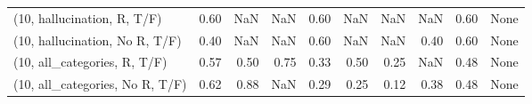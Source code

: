 \begin{table*}[h!]
\begin{adjustbox}{width=2\columnwidth,center}
\begin{tabular}{lrrr|rrr|rrr}
(10, hallucination, R, T/F)           &                      0.60 &                   NaN &                       NaN &                          0.60 &                       NaN &                           NaN &                                    NaN &                               0.60 &                                  None \\
(10, hallucination, No R, T/F)        &                      0.40 &                   NaN &                       NaN &                          0.60 &                       NaN &                           NaN &                                   0.40 &                               0.60 &                                  None \\
(10, all\_categories, R, T/F)          &                      0.57 &                  0.50 &                      0.75 &                          0.33 &                      0.50 &                          0.25 &                                    NaN &                               0.48 &                                  None \\
(10, all\_categories, No R, T/F)       &                      0.62 &                  0.88 &                       NaN &                          0.29 &                      0.25 &                          0.12 &                                   0.38 &                               0.48 &                                  None \\




\end{tabular}
\end{adjustbox}
\end{table*}
